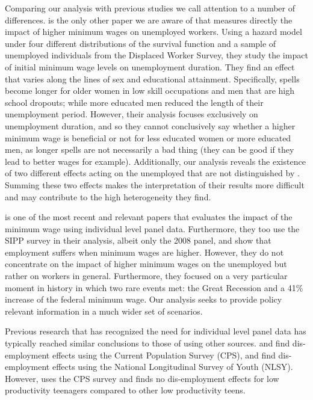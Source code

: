 \documentclass{article}
\begin{document}
Comparing our analysis with previous studies we call attention to a number of differences. \cite{pedace2011impact} is the only other paper we are aware of that measures directly the impact of higher minimum wages on unemployed workers. Using a hazard model under four different distributions of the survival function and a sample of unemployed individuals from the Displaced Worker Survey, they study the impact of initial minimum wage levels on unemployment duration. They find an effect that varies along the lines of sex and educational attainment. Specifically, spells become longer for older women in low skill occupations and men that are high school dropouts; while more educated men reduced the length of their unemployment period. However, their analysis focuses exclusively on unemployment duration, and so they cannot conclusively say whether a higher minimum wage is beneficial or not for less educated women or more educated men, as longer spells are not necessarily a bad thing (they can be good if they lead to better wages for example). Additionally, our analysis reveals the existence of two different effects acting on the unemployed that are not distinguished by \citeauthor{pedace2011impact}. Summing these two effects makes the interpretation of their results more difficult and may contribute to the high heterogeneity they find.

\cite{clemens2019minimum} is one of the most recent and relevant papers that evaluates the impact of the minimum wage using individual level panel data. Furthermore, they too use the SIPP survey in their analysis, albeit only the 2008 panel, and show that employment suffers when minimum wages are higher. However, they do not concentrate on the impact of higher minimum wages on the unemployed but rather on workers in general. Furthermore, they focused on a very particular moment in history in which two rare events met: the Great Recession and a 41\% increase of the federal minimum wage. Our analysis seeks to provide policy relevant information in a much wider set of scenarios. 

Previous research that has recognized the need for individual level panel data has typically reached similar conclusions to those of \citeauthor{clemens2019minimum} using other sources. \cite{neumark1995effects} and \cite{abowd1997minimum} find dis-employment effects using the Current Population Survey (CPS), and \cite{currie1993minimum} find dis-employment effects using the National Longitudinal Survey of Youth (NLSY). However, \cite{zavodny2000effect} uses the CPS survey and finds no dis-employment effects for low productivity teenagers compared to other low productivity teens. 
\end{document}
